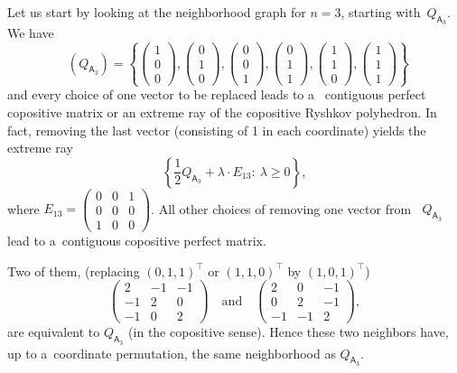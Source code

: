 \documentclass{commat}
\newcommand{\cop}{{\mathcal{COP}}}
\DeclareMathOperator{\MinC}{Min_{\cop}}
\begin{document}
Let us start by looking at the neighborhood graph for \(n=3 \), starting with~\(Q_{\mathsf{A}_3} \).
We have
\[
    \MinC (Q_{\mathsf{A}_3})=
    \left\{
    \begin{pmatrix}
1 \\ 0 \\ 0
\end{pmatrix}
,
    \begin{pmatrix}
0 \\ 1 \\ 0
\end{pmatrix}
,
    \begin{pmatrix}
0 \\ 0 \\ 1
\end{pmatrix}
,
    \begin{pmatrix}
0 \\ 1 \\ 1
\end{pmatrix}
,
    \begin{pmatrix}
1 \\ 1 \\ 0
\end{pmatrix}
,
    \begin{pmatrix}
1 \\ 1 \\ 1
\end{pmatrix}
    \right\}
\]
and every choice of one vector to be replaced leads to a~
contiguous perfect copositive matrix or an extreme ray of the copositive Ryshkov polyhedron.
In fact, removing the last vector (consisting of 1 in each coordinate) yields the extreme ray
\[
    \left\{ \frac12 Q_{\mathsf{A}_3}+\lambda\cdot E_{13} :\ \lambda\geq0 \right\},
\]
where \(E_{13} =
\begin{pmatrix}
0 & 0 & 1 \\ 0 & 0 & 0 \\ 1 & 0 & 0
\end{pmatrix}
\).
All other choices of removing one vector from \(\MinC Q_{\mathsf{A}_3} \) lead to a~contiguous
copositive perfect matrix.

Two of them, (replacing \({(0,1,1)}^\intercal \) or \({(1,1,0)}^\intercal\) by \({(1,0,1)}^\intercal \))
\[
    \begin{pmatrix}
2 & -1 & -1 \\ -1 & 2 & 0 \\ -1 & 0 & 2
\end{pmatrix}
    \quad\mbox{and}\quad
    \begin{pmatrix}
2 & 0 & -1 \\ 0 & 2 & -1 \\ -1 & -1 & 2
\end{pmatrix}
,
\]
are equivalent to \(Q_{\mathsf{A}_3} \) (in the copositive sense).
Hence these two neighbors have, up to a~coordinate permutation,
the same neighborhood as \(Q_{\mathsf{A}_3} \).
\end{document}
